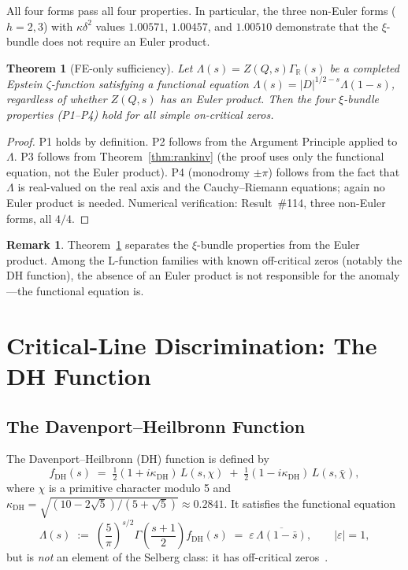 \documentclass[11pt, a4paper]{article}
\theoremstyle{plain}
\newtheorem{theorem}{Theorem}
\theoremstyle{definition}
\newtheorem{remark}{Remark}[section]
\newcommand{\DHf}{\mathrm{DH}}         %
\begin{document}
All four forms pass all four properties.  In particular, the three
non-Euler forms ($h=2,3$) with $\kappa\delta^{2}$ values
$1.00571$, $1.00457$, and $1.00510$ demonstrate that the $\xi$-bundle
does not require an Euler product.

\begin{theorem}[FE-only sufficiency]
\label{thm:feonly}
  Let $\Lambda(s)=Z(Q,s)\Gamma_{\mathbb{R}}(s)$ be a completed Epstein
  $\zeta$-function satisfying a functional equation $\Lambda(s)=|D|^{1/2-s}
  \Lambda(1-s)$, regardless of whether $Z(Q,s)$ has an Euler product.
  Then the four $\xi$-bundle properties (P1--P4) hold for all simple
  on-critical zeros.
\end{theorem}

\begin{proof}
  P1 holds by definition.  P2 follows from the Argument Principle applied
  to $\Lambda$.  P3 follows from Theorem~\ref{thm:rankinv} (the proof uses
  only the functional equation, not the Euler product).  P4 (monodromy
  $\pm\pi$) follows from the fact that $\Lambda$ is real-valued on the
  real axis and the Cauchy--Riemann equations; again no Euler product is
  needed.  Numerical verification: Result~\#114, three non-Euler forms,
  all $4/4$.
\end{proof}

\begin{remark}
  Theorem~\ref{thm:feonly} separates the $\xi$-bundle properties from
  the Euler product.  Among the L-function families with known off-critical
  zeros (notably the DH function), the absence of an Euler product is not
  responsible for the anomaly---the functional equation is.
\end{remark}


\section{Critical-Line Discrimination: The DH Function}
\label{sec:dh}

\subsection{The Davenport--Heilbronn Function}
\label{ssec:dhdef}

The Davenport--Heilbronn (DH) function is defined by
\[
  f_{\DHf}(s) \;=\; \tfrac{1}{2}(1+i\kappa_{\DHf})\,L(s,\chi)
              \;+\; \tfrac{1}{2}(1-i\kappa_{\DHf})\,L(s,\bar{\chi}),
\]
where $\chi$ is a primitive character modulo 5 and
$\kappa_{\DHf} = \sqrt{(10-2\sqrt{5})/(5+\sqrt{5})} \approx 0.2841$.
It satisfies the functional equation
\[
  \Lambda(s) \;:=\; \left(\frac{5}{\pi}\right)^{s/2}\Gamma\!\left(\frac{s+1}{2}\right)f_{\DHf}(s)
  \;=\; \varepsilon\,\overline{\Lambda(1-\bar{s})},
  \qquad |\varepsilon|=1,
\]
but is \emph{not} an element of the Selberg class: it has off-critical
zeros~\cite{titchmarsh1986}.
\end{document}
